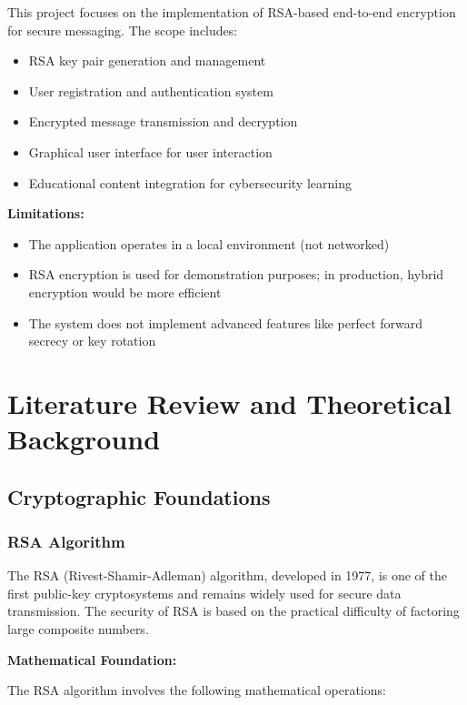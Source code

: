 \documentclass[12pt,a4paper]{article}
\begin{document}
This project focuses on the implementation of RSA-based end-to-end encryption for secure messaging. The scope includes:

\begin{itemize}
    \item RSA key pair generation and management
    \item User registration and authentication system
    \item Encrypted message transmission and decryption
    \item Graphical user interface for user interaction
    \item Educational content integration for cybersecurity learning
\end{itemize}

\textbf{Limitations:}
\begin{itemize}
    \item The application operates in a local environment (not networked)
    \item RSA encryption is used for demonstration purposes; in production, hybrid encryption would be more efficient
    \item The system does not implement advanced features like perfect forward secrecy or key rotation
\end{itemize}

\section{Literature Review and Theoretical Background}

\subsection{Cryptographic Foundations}

\subsubsection{RSA Algorithm}

The RSA (Rivest-Shamir-Adleman) algorithm, developed in 1977, is one of the first public-key cryptosystems and remains widely used for secure data transmission. The security of RSA is based on the practical difficulty of factoring large composite numbers.

\textbf{Mathematical Foundation:}

The RSA algorithm involves the following mathematical operations:
\end{document}
